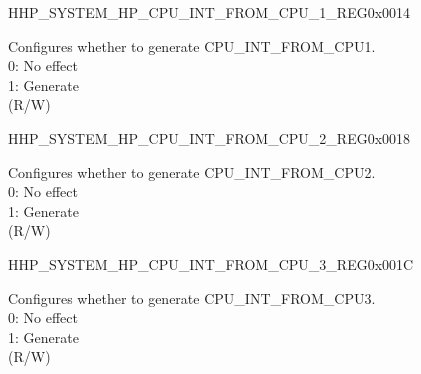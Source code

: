 \begin{register}{H}{HP\_SYSTEM\_HP\_CPU\_INT\_FROM\_CPU\_1\_REG}{0x0014}\label{regdesc:HPSYSTEMHPCPUINTFROMCPU1REG}
%
%
\regnewline%
\begin{regdesc}\begin{reglist}
\label{fielddesc:HPSYSTEMCPUINTFROMCPU1}\item [HP\_SYSTEM\_CPU\_INT\_FROM\_CPU\_1] Configures whether to generate CPU\_INT\_FROM\_CPU1.\\
0: No effect\\
1: Generate\\
(R/W)
\end{reglist}\end{regdesc}
\end{register}


\begin{register}{H}{HP\_SYSTEM\_HP\_CPU\_INT\_FROM\_CPU\_2\_REG}{0x0018}\label{regdesc:HPSYSTEMHPCPUINTFROMCPU2REG}
%
%
\regnewline%
\begin{regdesc}\begin{reglist}
\label{fielddesc:HPSYSTEMCPUINTFROMCPU2}\item [HP\_SYSTEM\_CPU\_INT\_FROM\_CPU\_2] Configures whether to generate CPU\_INT\_FROM\_CPU2.\\
0: No effect\\
1: Generate\\
(R/W)
\end{reglist}\end{regdesc}
\end{register}


\begin{register}{H}{HP\_SYSTEM\_HP\_CPU\_INT\_FROM\_CPU\_3\_REG}{0x001C}\label{regdesc:HPSYSTEMHPCPUINTFROMCPU3REG}
%
%
\regnewline%
\begin{regdesc}\begin{reglist}
\label{fielddesc:HPSYSTEMCPUINTFROMCPU3}\item [HP\_SYSTEM\_CPU\_INT\_FROM\_CPU\_3] Configures whether to generate CPU\_INT\_FROM\_CPU3.\\
0: No effect\\
1: Generate\\
(R/W)
\end{reglist}\end{regdesc}
\end{register}


